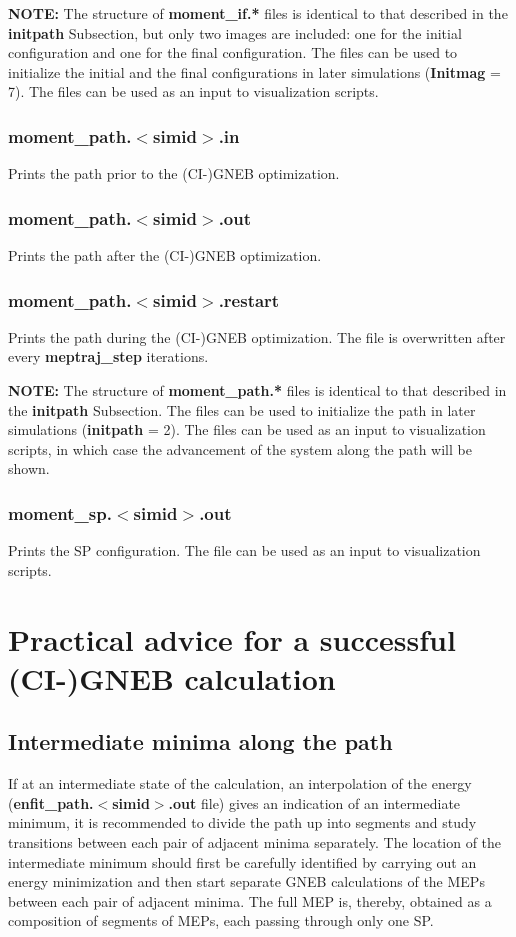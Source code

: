 \documentclass{article}
\begin{document}
{\bf NOTE:} The structure of {\bf moment\_if.*} files is identical to that described in the {\bf initpath} Subsection, but only two images are included: one for the initial configuration and one for the final configuration. The files can be used to initialize the initial and the final configurations in later simulations ({\bf Initmag} = 7). The files can be used as an input to visualization scripts.

\subsubsection*{moment\_path.$<$simid$>$.in}
Prints the path prior to the (CI-)GNEB optimization. 

\subsubsection*{moment\_path.$<$simid$>$.out}
Prints the path after the (CI-)GNEB optimization. 

\subsubsection*{moment\_path.$<$simid$>$.restart}
Prints the path during the (CI-)GNEB optimization. The file is overwritten after every {\bf meptraj\_step} iterations. 

{\bf NOTE:} The structure of {\bf moment\_path.*} files is identical to that described in the {\bf initpath} Subsection. The files can be used to initialize the path in later simulations ({\bf initpath} = 2). The files can be used as an input to visualization scripts, in which case the advancement of the system along the path will be shown.

\subsubsection*{moment\_sp.$<$simid$>$.out}
Prints the SP configuration. The file can be used as an input to visualization scripts.

\section{Practical advice for a successful (CI-)GNEB calculation}

\subsection{Intermediate minima along the path}
If at an intermediate state of the calculation, an interpolation of the energy ({\bf enfit\_path.$<$simid$>$.out} file) gives an indication of an intermediate minimum, it is recommended to divide the path up into segments and study transitions between each pair of adjacent minima separately. The location of the intermediate minimum should first be carefully identified by carrying out an energy minimization and then start separate GNEB calculations of the MEPs between each pair of adjacent minima. The full MEP is, thereby, obtained as a composition of segments of MEPs, each passing through only one SP.
\end{document}
